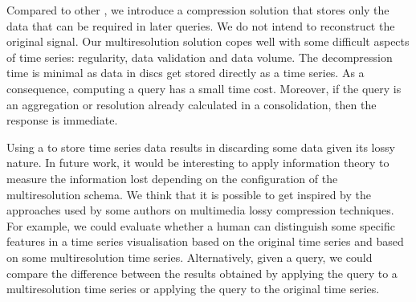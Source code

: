 Compared to other , we introduce a compression solution
that stores only the data that can be required in later queries. We do
not intend to reconstruct the original signal. Our multiresolution
solution copes well with some difficult aspects of time series:
regularity, data validation and data volume.  The decompression time
is minimal as data in discs get stored directly as a time series. As a
consequence, computing a query has a small time cost. Moreover, if the
query is an aggregation or resolution already calculated in a
 consolidation, then the response is immediate.


Using a  to store time series data results in discarding
some data given its lossy nature.  In future work, it would be
interesting to apply information theory to measure the information
lost depending on the configuration of the multiresolution schema. We
think that it is possible to get inspired by the approaches used by
some authors on multimedia lossy compression techniques. For example,
we could evaluate whether a human can distinguish some specific
features in a time series visualisation based on the original time
series and based on some multiresolution time series. Alternatively,
given a query, we could compare the difference between the results
obtained by applying the query to a multiresolution time series or
applying the query to the original time series.



